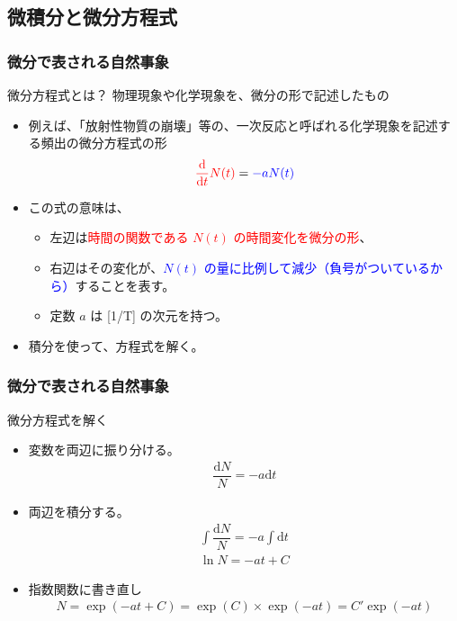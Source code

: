 \documentclass[12pt, dvipdfmx]{beamer}
\begin{document}
\subsection{微積分と微分方程式}
\begin{frame}
	\frametitle{微分で表される自然事象}
		\begin{alertblock}{微分方程式とは？}
			物理現象や化学現象を、微分の形で記述したもの
			\begin{itemize}
				\item 例えば、「放射性物質の崩壊」等の、一次反応と呼ばれる化学現象を記述する頻出の微分方程式の形
				\begin{align*}
					\textcolor{red}{\dfrac{\mathrm{d}}{\mathrm{d} t} N(t)} = \textcolor{blue}{-aN(t)}
				\end{align*}
				\item この式の意味は、
				\begin{itemize}
					\item 左辺は\textcolor{red}{時間の関数である $N(t)$ の時間変化を微分の形}、
					\item 右辺はその変化が、\textcolor{blue}{$N(t)$ の量に比例して減少（負号がついているから）}することを表す。
					\item 定数 $a$ は [1/T] の次元を持つ。
				\end{itemize}
				\item \alert{積分を使って、方程式を解く。}
			\end{itemize}
		\end{alertblock}		
\end{frame}

\begin{frame}
	\frametitle{微分で表される自然事象}
		\begin{exampleblock}{微分方程式を解く}
			\begin{itemize}
				\item 変数を両辺に振り分ける。
				\small
				\begin{align*}
					\dfrac{\mathrm{d}N}{N} = -a\mathrm{d} t
				\end{align*}
				\normalsize
				\item 両辺を積分する。
				\small
				\begin{align*}
					\int \dfrac{\mathrm{d}N}{N} = -a \int \mathrm{d} t \\
					\ln N = -at + C
				\end{align*}
				\normalsize
				\item 指数関数に書き直し
				\small
				\begin{align*}
					N=\exp(-at + C) = \exp(C) \times \exp(-at) = C' \exp(-at)
				\end{align*}
				\normalsize
			\end{itemize}
		\end{exampleblock}
\end{frame}
\end{document}

